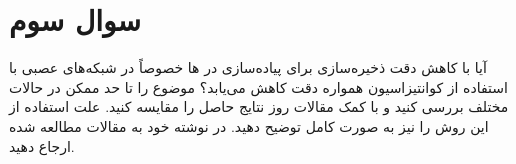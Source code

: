 \section{سوال سوم}
آیا با کاهش دقت ذخیره‌سازی برای پیاده‌سازی در ها خصوصاً در شبکه‌های عصبی با استفاده از کوانتیزاسیون همواره دقت کاهش می‌یابد؟ موضوع را تا حد ممکن در حالات مختلف بررسی کنید و با کمک مقالات روز نتایج حاصل را مقایسه کنید. علت استفاده از این روش را نیز به صورت کامل توضیح دهید. در نوشته خود به مقالات مطالعه شده ارجاع دهید.




\begin{qsolve}
	
\end{qsolve}